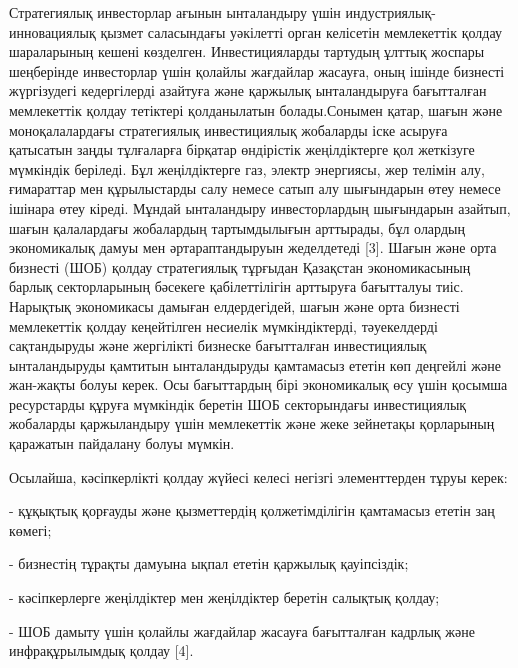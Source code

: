 Стратегиялық инвесторлар ағынын ынталандыру үшін
индустриялық-инновациялық қызмет саласындағы уәкілетті орган келісетін
мемлекеттік қолдау шараларының кешені көзделген. Инвестицияларды
тартудың ұлттық жоспары шеңберінде инвесторлар үшін қолайлы жағдайлар
жасауға, оның ішінде бизнесті жүргізудегі кедергілерді азайтуға және
қаржылық ынталандыруға бағытталған мемлекеттік қолдау тетіктері
қолданылатын болады.Сонымен қатар, шағын және моноқалалардағы
стратегиялық инвестициялық жобаларды іске асыруға қатысатын заңды
тұлғаларға бірқатар өндірістік жеңілдіктерге қол жеткізуге мүмкіндік
беріледі. Бұл жеңілдіктерге газ, электр энергиясы, жер телімін алу,
ғимараттар мен құрылыстарды салу немесе сатып алу шығындарын өтеу немесе
ішінара өтеу кіреді. Мұндай ынталандыру инвесторлардың шығындарын
азайтып, шағын қалалардағы жобалардың тартымдылығын арттырады, бұл
олардың экономикалық дамуы мен әртараптандыруын жеделдетеді {[}3{]}.
Шағын және орта бизнесті (ШОБ) қолдау стратегиялық тұрғыдан Қазақстан
экономикасының барлық секторларының бәсекеге қабілеттілігін арттыруға
бағытталуы тиіс. Нарықтық экономикасы дамыған елдердегідей, шағын және
орта бизнесті мемлекеттік қолдау кеңейтілген несиелік мүмкіндіктерді,
тәуекелдерді сақтандыруды және жергілікті бизнеске бағытталған
инвестициялық ынталандыруды қамтитын ынталандыруды қамтамасыз ететін көп
деңгейлі және жан-жақты болуы керек. Осы бағыттардың бірі экономикалық
өсу үшін қосымша ресурстарды құруға мүмкіндік беретін ШОБ секторындағы
инвестициялық жобаларды қаржыландыру үшін мемлекеттік және жеке
зейнетақы қорларының қаражатын пайдалану болуы мүмкін.

Осылайша, кәсіпкерлікті қолдау жүйесі келесі негізгі элементтерден тұруы
керек:

- құқықтық қорғауды және қызметтердің қолжетімділігін қамтамасыз ететін
заң көмегі;

- бизнестің тұрақты дамуына ықпал ететін қаржылық қауіпсіздік;

- кәсіпкерлерге жеңілдіктер мен жеңілдіктер беретін салықтық қолдау;

- ШОБ дамыту үшін қолайлы жағдайлар жасауға бағытталған кадрлық және
инфрақұрылымдық қолдау {[}4{]}.

